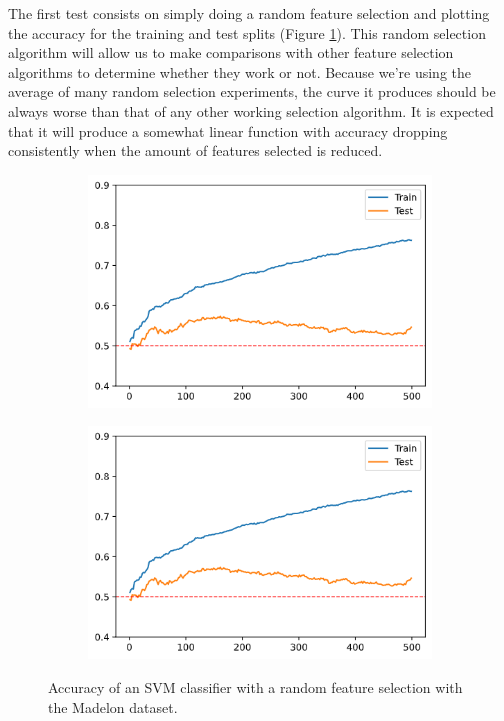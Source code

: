 The first test consists on simply doing a random feature selection and plotting the accuracy for the training and test splits (Figure \ref{fig:dynamicStep.madelon.base}). This random selection algorithm will allow us to make comparisons with other feature selection algorithms to determine whether they work or not. Because we're using the average of many random selection experiments, the curve it produces should be always worse than that of any other working selection algorithm. It is expected that it will produce a somewhat linear function with accuracy dropping consistently when the amount of features selected is reduced.

\begin{figure}[H]
    \centering
    \begin{subfigure}[b]{0.4\linewidth}
        \includegraphics[width=\linewidth]{img/madelon-random-c_1}
    \end{subfigure}
    \begin{subfigure}[b]{0.4\linewidth}
        \includegraphics[width=\linewidth]{img/madelon-random-c_1}
    \end{subfigure}
    \caption{Accuracy of an SVM classifier with a random feature selection with the Madelon dataset.}
    \label{fig:dynamicStep.madelon.base}
\end{figure}

